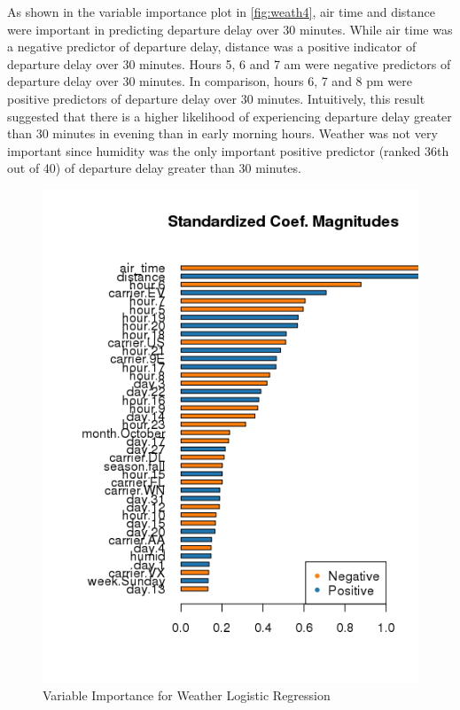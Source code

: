 \documentclass[12pt,twoside]{amherstthesis}
\begin{document}
  \clearpage
  
  As shown in the variable importance plot in \autoref{fig:weath4}, air
  time and distance were important in predicting departure delay over 30
  minutes. While air time was a negative predictor of departure delay,
  distance was a positive indicator of departure delay over 30 minutes.
  Hours 5, 6 and 7 am were negative predictors of departure delay over 30
  minutes. In comparison, hours 6, 7 and 8 pm were positive predictors of
  departure delay over 30 minutes. Intuitively, this result suggested that
  there is a higher likelihood of experiencing departure delay greater
  than 30 minutes in evening than in early morning hours. Weather was not
  very important since humidity was the only important positive predictor
  (ranked 36th out of 40) of departure delay greater than 30 minutes.
  
  \begin{Shaded}
  \begin{Highlighting}[]
  \end{Highlighting}
  \end{Shaded}
  
  \begin{figure}[htbp]
  \centering
  \includegraphics[scale = 1,angle = 0]{figure/top40Weather.png}
  \caption[Variable Importance for Weather Logistic Regression]{\normalsize{Variable Importance for Weather Logistic Regression}}
  \label{fig:weath4}
  \end{figure}
  
\end{document}
